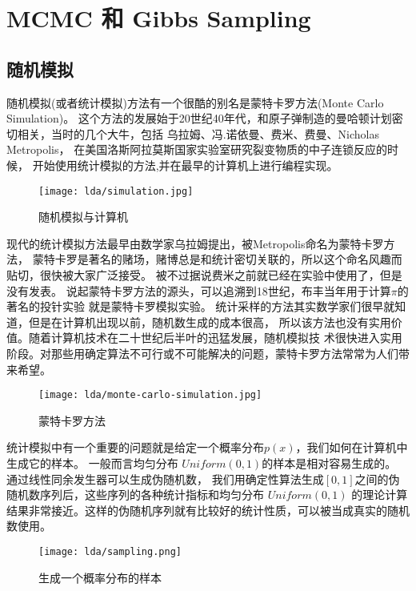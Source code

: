 %
\chapter{MCMC 和 Gibbs Sampling}
\section{随机模拟}

随机模拟(或者统计模拟)方法有一个很酷的别名是蒙特卡罗方法(Monte Carlo Simulation)。
这个方法的发展始于20世纪40年代，和原子弹制造的曼哈顿计划密切相关，当时的几个大牛，包括
乌拉姆、冯.诺依曼、费米、费曼、Nicholas Metropolis，
在美国洛斯阿拉莫斯国家实验室研究裂变物质的中子连锁反应的时候，
开始使用统计模拟的方法,并在最早的计算机上进行编程实现。

\begin{figure}[htbp]
\centering
\texttt{[image: lda/simulation.jpg]}
\caption{随机模拟与计算机}
\end{figure}

现代的统计模拟方法最早由数学家乌拉姆提出，被Metropolis命名为蒙特卡罗方法，
蒙特卡罗是著名的赌场，赌博总是和统计密切关联的，所以这个命名风趣而贴切，很快被大家广泛接受。
被不过据说费米之前就已经在实验中使用了，但是没有发表。
说起蒙特卡罗方法的源头，可以追溯到18世纪，布丰当年用于计算$\pi$的著名的投针实验
就是蒙特卡罗模拟实验。
统计采样的方法其实数学家们很早就知道，但是在计算机出现以前，随机数生成的成本很高，
所以该方法也没有实用价值。随着计算机技术在二十世纪后半叶的迅猛发展，随机模拟技
术很快进入实用阶段。对那些用确定算法不可行或不可能解决的问题，蒙特卡罗方法常常为人们带来希望。

\begin{figure}[htbp]
\centering
\texttt{[image: lda/monte-carlo-simulation.jpg]}
\caption{蒙特卡罗方法}
\end{figure}

统计模拟中有一个重要的问题就是给定一个概率分布$p(x)$，我们如何在计算机中生成它的样本。
一般而言均匀分布 $Uniform(0,1)$的样本是相对容易生成的。 通过线性同余发生器可以生成伪随机数，
我们用确定性算法生成$[0,1]$之间的伪随机数序列后，这些序列的各种统计指标和均匀分布 $Uniform(0,1)$
的理论计算结果非常接近。这样的伪随机序列就有比较好的统计性质，可以被当成真实的随机数使用。

\begin{figure}[htbp]
\centering
\texttt{[image: lda/sampling.png]}
\caption{生成一个概率分布的样本}
\end{figure}

